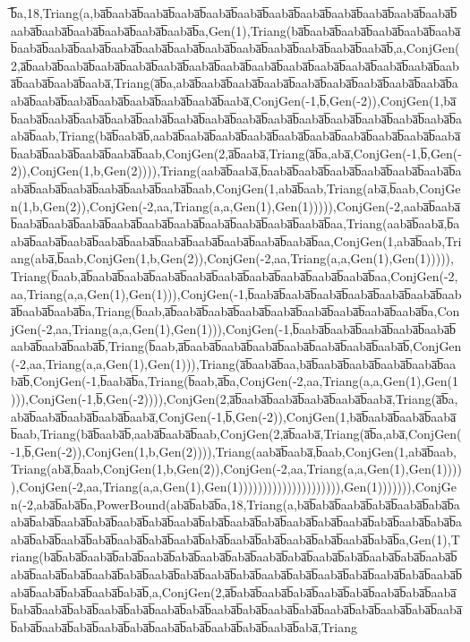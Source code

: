 ̅b̅a,18,Triang(a,ba̅b̅aaba̅b̅aaba̅b̅aaba̅b̅aaba̅b̅aaba̅b̅aaba̅b̅aaba̅b̅aaba̅b̅aaba̅b̅aaba̅b̅aaba̅b̅aaba̅b̅aaba̅b̅aaba̅b̅aaba̅b̅aaba̅b̅aaba̅b̅a,Gen(1),Triang(ba̅b̅aaba̅b̅aaba̅b̅aaba̅b̅aaba̅b̅aaba̅b̅aaba̅b̅aaba̅b̅aaba̅b̅aaba̅b̅aaba̅b̅aaba̅b̅aaba̅b̅aaba̅b̅aaba̅b̅aaba̅b̅aaba̅b̅aaba̅b̅,a,ConjGen(2,a̅b̅aaba̅b̅aaba̅b̅aaba̅b̅aaba̅b̅aaba̅b̅aaba̅b̅aaba̅b̅aaba̅b̅aaba̅b̅aaba̅b̅aaba̅b̅aaba̅b̅aaba̅b̅aaba̅b̅aaba̅b̅aaba̅b̅aaba̅,Triang(a̅b̅a,aba̅b̅aaba̅b̅aaba̅b̅aaba̅b̅aaba̅b̅aaba̅b̅aaba̅b̅aaba̅b̅aaba̅b̅aaba̅b̅aaba̅b̅aaba̅b̅aaba̅b̅aaba̅b̅aaba̅b̅aaba̅b̅aaba̅,ConjGen(-1,b̅,Gen(-2)),ConjGen(1,ba̅b̅aaba̅b̅aaba̅b̅aaba̅b̅aaba̅b̅aaba̅b̅aaba̅b̅aaba̅b̅aaba̅b̅aaba̅b̅aaba̅b̅aaba̅b̅aaba̅b̅aaba̅b̅aaba̅b̅aaba̅b̅aab,Triang(ba̅b̅aaba̅b̅,aaba̅b̅aaba̅b̅aaba̅b̅aaba̅b̅aaba̅b̅aaba̅b̅aaba̅b̅aaba̅b̅aaba̅b̅aaba̅b̅aaba̅b̅aaba̅b̅aaba̅b̅aaba̅b̅aab,ConjGen(2,a̅b̅aaba̅,Triang(a̅b̅a,aba̅,ConjGen(-1,b̅,Gen(-2)),ConjGen(1,b,Gen(2)))),Triang(aaba̅b̅aaba̅,b̅aaba̅b̅aaba̅b̅aaba̅b̅aaba̅b̅aaba̅b̅aaba̅b̅aaba̅b̅aaba̅b̅aaba̅b̅aaba̅b̅aaba̅b̅aaba̅b̅aab,ConjGen(1,aba̅b̅aab,Triang(aba̅,b̅aab,ConjGen(1,b,Gen(2)),ConjGen(-2,aa,Triang(a,a,Gen(1),Gen(1))))),ConjGen(-2,aaba̅b̅aaba̅b̅aaba̅b̅aaba̅b̅aaba̅b̅aaba̅b̅aaba̅b̅aaba̅b̅aaba̅b̅aaba̅b̅aaba̅b̅aaba̅b̅aa,Triang(aaba̅b̅aaba̅,b̅aaba̅b̅aaba̅b̅aaba̅b̅aaba̅b̅aaba̅b̅aaba̅b̅aaba̅b̅aaba̅b̅aaba̅b̅aaba̅b̅aa,ConjGen(1,aba̅b̅aab,Triang(aba̅,b̅aab,ConjGen(1,b,Gen(2)),ConjGen(-2,aa,Triang(a,a,Gen(1),Gen(1))))),Triang(b̅aab,a̅b̅aaba̅b̅aaba̅b̅aaba̅b̅aaba̅b̅aaba̅b̅aaba̅b̅aaba̅b̅aaba̅b̅aaba̅b̅aa,ConjGen(-2,aa,Triang(a,a,Gen(1),Gen(1))),ConjGen(-1,b̅aaba̅b̅aaba̅b̅aaba̅b̅aaba̅b̅aaba̅b̅aaba̅b̅aaba̅b̅aaba̅b̅aaba̅b̅a,Triang(b̅aab,a̅b̅aaba̅b̅aaba̅b̅aaba̅b̅aaba̅b̅aaba̅b̅aaba̅b̅aaba̅b̅aaba̅b̅a,ConjGen(-2,aa,Triang(a,a,Gen(1),Gen(1))),ConjGen(-1,b̅aaba̅b̅aaba̅b̅aaba̅b̅aaba̅b̅aaba̅b̅aaba̅b̅aaba̅b̅aaba̅b̅,Triang(b̅aab,a̅b̅aaba̅b̅aaba̅b̅aaba̅b̅aaba̅b̅aaba̅b̅aaba̅b̅aaba̅b̅,ConjGen(-2,aa,Triang(a,a,Gen(1),Gen(1))),Triang(a̅b̅aaba̅b̅aa,ba̅b̅aaba̅b̅aaba̅b̅aaba̅b̅aaba̅b̅aaba̅b̅,ConjGen(-1,b̅aaba̅b̅a,Triang(b̅aab,a̅b̅a,ConjGen(-2,aa,Triang(a,a,Gen(1),Gen(1))),ConjGen(-1,b̅,Gen(-2)))),ConjGen(2,a̅b̅aaba̅b̅aaba̅b̅aaba̅b̅aaba̅b̅aaba̅,Triang(a̅b̅a,aba̅b̅aaba̅b̅aaba̅b̅aaba̅b̅aaba̅,ConjGen(-1,b̅,Gen(-2)),ConjGen(1,ba̅b̅aaba̅b̅aaba̅b̅aaba̅b̅aab,Triang(ba̅b̅aaba̅b̅,aaba̅b̅aaba̅b̅aab,ConjGen(2,a̅b̅aaba̅,Triang(a̅b̅a,aba̅,ConjGen(-1,b̅,Gen(-2)),ConjGen(1,b,Gen(2)))),Triang(aaba̅b̅aaba̅,b̅aab,ConjGen(1,aba̅b̅aab,Triang(aba̅,b̅aab,ConjGen(1,b,Gen(2)),ConjGen(-2,aa,Triang(a,a,Gen(1),Gen(1))))),ConjGen(-2,aa,Triang(a,a,Gen(1),Gen(1))))))))))))))))))))),Gen(1))))))),ConjGen(-2,aba̅b̅aba̅b̅a,PowerBound(aba̅b̅aba̅b̅a,18,Triang(a,ba̅b̅aba̅b̅aaba̅b̅aba̅b̅aaba̅b̅aba̅b̅aaba̅b̅aba̅b̅aaba̅b̅aba̅b̅aaba̅b̅aba̅b̅aaba̅b̅aba̅b̅aaba̅b̅aba̅b̅aaba̅b̅aba̅b̅aaba̅b̅aba̅b̅aaba̅b̅aba̅b̅aaba̅b̅aba̅b̅aaba̅b̅aba̅b̅aaba̅b̅aba̅b̅aaba̅b̅aba̅b̅aaba̅b̅aba̅b̅aaba̅b̅aba̅b̅aaba̅b̅aba̅b̅a,Gen(1),Triang(ba̅b̅aba̅b̅aaba̅b̅aba̅b̅aaba̅b̅aba̅b̅aaba̅b̅aba̅b̅aaba̅b̅aba̅b̅aaba̅b̅aba̅b̅aaba̅b̅aba̅b̅aaba̅b̅aba̅b̅aaba̅b̅aba̅b̅aaba̅b̅aba̅b̅aaba̅b̅aba̅b̅aaba̅b̅aba̅b̅aaba̅b̅aba̅b̅aaba̅b̅aba̅b̅aaba̅b̅aba̅b̅aaba̅b̅aba̅b̅aaba̅b̅aba̅b̅aaba̅b̅aba̅b̅,a,ConjGen(2,a̅b̅aba̅b̅aaba̅b̅aba̅b̅aaba̅b̅aba̅b̅aaba̅b̅aba̅b̅aaba̅b̅aba̅b̅aaba̅b̅aba̅b̅aaba̅b̅aba̅b̅aaba̅b̅aba̅b̅aaba̅b̅aba̅b̅aaba̅b̅aba̅b̅aaba̅b̅aba̅b̅aaba̅b̅aba̅b̅aaba̅b̅aba̅b̅aaba̅b̅aba̅b̅aaba̅b̅aba̅b̅aaba̅b̅aba̅b̅aaba̅b̅aba̅b̅aaba̅b̅aba̅,Triang
